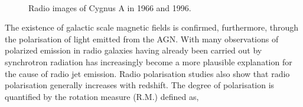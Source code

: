 \begin{figure}[!ht]
  \centering
  \\
  \caption[Cygnus A radio imaging in 1966 and 1996]{Radio images of Cygnus A in 1966 and 1996.}
  \label{fig:CygA}
\end{figure}

The existence of galactic scale magnetic fields is confirmed, furthermore, through the polarisation of light emitted from the AGN. With many observations of polarized emission in radio galaxies having already been carried out by synchrotron radiation has increasingly become a more plausible explanation for the cause of radio jet emission. Radio polarisation studies also show that radio polarisation generally increases with redshift. The degree of polarisation is quantified by the rotation measure (R.M.) defined as,

